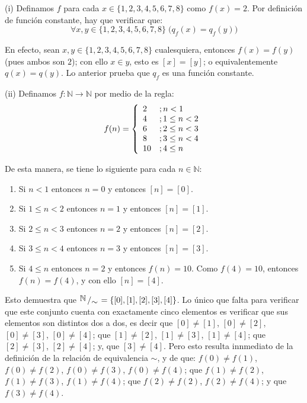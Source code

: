 \documentclass[letterpaper,DIV=14,headsepline,12pt]{scrartcl}
\makeatletter
\newcommand{\quot}[2]{{\raisebox{.2em}{$#1$}\left/\raisebox{-.2em}{$#2$}\right.}}
\newenvironment{solucion}[1][]{%
        \par\pushQED{\hfill \lozenge}%
        \normalfont\topsep6pt \partopsep0pt %
        \trivlist
        \item[\hskip\labelsep
                \textbf{\textit{Solución.}}%
        ]#1
        }{%
        \popQED\endtrivlist\@endpefalse
    }
\makeatother
\begin{document}
    \begin{solucion}
        (i) Definamos $f$ para cada $x \in \{1,2,3,4,5,6,7,8\}$ como $f(x)=2$. Por definición de función constante, hay que verificar que:
        \[ \forall x,y \in \{1,2,3,4,5,6,7,8\} \; \big( q_f(x) = q_f(y) \big) \]

        En efecto, sean $x,y \in \{1,2,3,4,5,6,7,8\}$ cualesquiera, entonces $f(x)=f(y)$ (pues ambos son $2$); con ello $x \in y$, esto es $[x]=[y]$; o equivalentemente $q(x)=q(y)$. Lo anterior prueba que $q_f$ es una función constante.

        (ii) Definamos $f:\mathbb{N} \to \mathbb{N}$ por medio de la regla:
        \[ f(n) = \left\lbrace \begin{array}{l l}
            2 & ; n < 1 \\
            4 & ; 1 \leq n < 2 \\
            6 & ; 2 \leq n < 3 \\
            8 & ; 3 \leq n < 4 \\
            10 & ; 4 \leq n 
        \end{array} \right. \]

        De esta manera, se tiene lo siguiente para cada $n \in \mathbb{N}$:
        \begin{enumerate}
            \item Si $n<1$ entonces $n=0$ y entonces $[n]=[0]$.
            \item Si $1 \leq n < 2$ entonces $n=1$ y entonces $[n]=[1]$.
            \item Si $2 \leq n < 3$ entonces $n=2$ y entonces $[n]=[2]$.
            \item Si $3 \leq n < 4$ entonces $n=3$ y entonces $[n]=[3]$.
            \item Si $4 \leq n$ entonces $n=2$ y entonces $f(n)=10$. Como $f(4)=10$, entonces $f(n)=f(4)$, y con  ello $[n]=[4]$.
        \end{enumerate}

        Esto demuestra que $\quot{\mathbb{N}}{\sim}=\{[0],[1],[2],[3],[4]\}$. Lo único que falta para verificar que este conjunto cuenta con exactamente cinco elementos es verificar que sus elementos son distintos dos a dos, es decir que $[0]\neq [1]$, $[0]\neq [2]$, $[0]\neq [3]$, $[0]\neq [4]$; que $[1]\neq [2]$, $[1]\neq [3]$, $[1]\neq [4]$; que $[2]\neq [3]$, $[2]\neq [4]$; y, que $[3]\neq [4]$. Pero esto resulta innmediato de la definición de la relación de equivalencia $\sim$, y de que: $f(0)\neq f(1)$, $f(0)\neq f(2)$, $f(0)\neq f(3)$, $f(0)\neq f(4)$; que $f(1)\neq f(2)$, $f(1)\neq f(3)$, $f(1)\neq f(4)$; que $f(2)\neq f(2)$, $f(2)\neq f(4)$; y que $f(3)\neq f(4)$.


\end{solucion}
\end{document}
